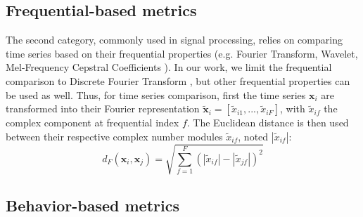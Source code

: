 \subsection{Frequential-based metrics}
The second category, commonly used in signal processing, relies on comparing time series based on their frequential properties (e.g. Fourier Transform, Wavelet, Mel-Frequency Cepstral Coefficients \cite{Sahidullah2012,Torrence1998,Brigham1967}). In our work, we limit the frequential comparison to Discrete Fourier Transform \cite{Lhermitte2011a}, but other frequential properties can be used as well. Thus, for time series comparison, first the time series $\textbf{x}_i$ are transformed into their Fourier representation $\tilde{\textbf{x}}_i=[\tilde{x}_{i1}, ...,  \tilde{x}_{iF}]$, with $\tilde{x}_{if}$ the complex component at frequential index $f$. The Euclidean distance is then used  between their respective complex number modules $\tilde{x}_{if}$, noted $|\tilde{x}_{if}|$:
\begin{equation}
d_{F}(\textbf{x}_i,\textbf{x}_j) = \sqrt{\sum_{f=1}^{F} 
	(|\tilde{x}_{if}|-|\tilde{x}_{jf}|)^2}
\label{eq:F}
\end{equation}


\subsection{Behavior-based metrics}

